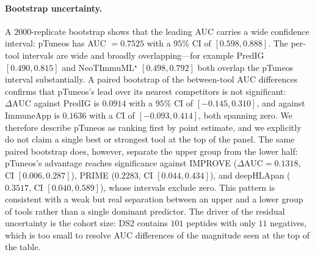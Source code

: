 \paragraph{Bootstrap uncertainty.} A $2000$-replicate bootstrap shows that the
leading AUC carries a wide confidence interval: pTuneos has AUC $= 0.7525$ with a
$95\%$ CI of $[0.598, 0.888]$. The per-tool intervals are wide and broadly
overlapping---for example PredIG $[0.490, 0.815]$ and NeoTImmuML$^\star$
$[0.498, 0.792]$ both overlap the pTuneos interval substantially. A paired
bootstrap of the between-tool AUC differences confirms that pTuneos's lead over
its nearest competitors is not significant: $\Delta\mathrm{AUC}$ against PredIG is
$0.0914$ with a $95\%$ CI of $[-0.145, 0.310]$, and against ImmuneApp is $0.1636$
with a CI of $[-0.093, 0.414]$, both spanning zero. We therefore describe pTuneos
as ranking first by point estimate, and we explicitly do not claim a single best
or strongest tool at the top of the panel. The same paired bootstrap does,
however, separate the upper group from the lower half: pTuneos's advantage reaches
significance against IMPROVE ($\Delta\mathrm{AUC} = 0.1318$, CI $[0.006, 0.287]$),
PRIME ($0.2283$, CI $[0.044, 0.434]$), and deepHLApan ($0.3517$, CI
$[0.040, 0.589]$), whose intervals exclude zero. This pattern is consistent with a
weak but real separation between an upper and a lower group of tools rather than a
single dominant predictor. The driver of the residual uncertainty is the cohort
size: DS2 contains $101$ peptides with only $11$ negatives, which is too small to
resolve AUC differences of the magnitude seen at the top of the table.

